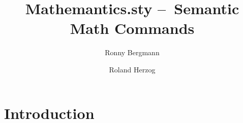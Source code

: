 \documentclass[english,a4paper,DIV=12,parskip=full]{scrartcl}
\date{\ISOToday}
\author{Ronny Bergmann \and Roland Herzog}
\title{Mathemantics.sty – Semantic Math Commands}
\begin{document}
    \maketitle
    \section{Introduction}
\end{document}
